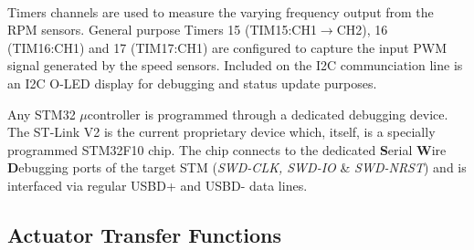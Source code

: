 \\
Timers channels are used to measure the varying frequency output from the RPM sensors. General purpose Timers 15 (TIM15:CH1$\rightarrow$CH2), 16 (TIM16:CH1) and 17 (TIM17:CH1) are configured to capture the input PWM signal generated by the speed sensors. Included on the I2C communciation line is an I2C O-LED display for debugging and status update purposes.
\par
Any STM32 $\mu$controller is programmed through a dedicated debugging device. The ST-Link V2\cite{st-link} is the current proprietary device which, itself, is a specially programmed STM32F10 chip. The chip connects to the dedicated \textbf{S}erial \textbf{W}ire \textbf{D}ebugging ports of the target STM (\emph{SWD-CLK, SWD-IO} \& \emph{SWD-NRST}) and is interfaced via regular USBD+ and USBD- data lines. 
\subsection{Actuator Transfer Functions}
\label{subsec:proto.design.transfer}
